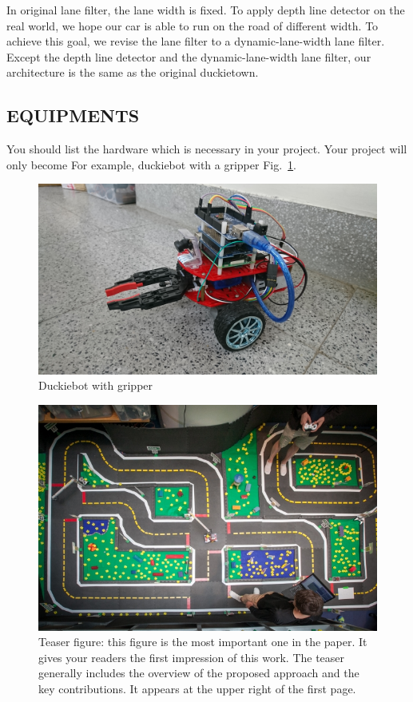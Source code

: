 \documentclass[letterpaper, 10 pt, conference]{ieeeconf}  %
\begin{document}
In original lane filter, the lane width is fixed. To apply depth line detector on the real world, we hope our car is able to run on the road of different width. To achieve this goal, we revise the lane filter to a dynamic-lane-width lane filter. Except the depth line detector and the dynamic-lane-width lane filter, our architecture is the same as the original duckietown.




\subsection{EQUIPMENTS} 

You should list the hardware which is necessary in your project. Your project will only become For example, duckiebot with a gripper Fig.~\ref{figure:duckiebot_gripper}.
\begin{figure}[h] %
\includegraphics[width=0.8\columnwidth]{duckiebot_gripper}
\centering
\caption{Duckiebot with gripper}
 \label{figure:duckiebot_gripper}
\end{figure}

\begin{figure}[t] %
\includegraphics[width=0.8\columnwidth]{duck}
\centering
\caption{Teaser figure: this figure is the most important one in the paper. It gives your readers the first impression of this work. The teaser generally includes the overview of the proposed approach and the key contributions. It appears at the upper right of the first page.}
\end{figure}
\end{document}
